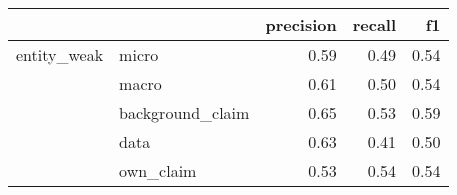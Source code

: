 \begin{tabular}{llrrr}
\toprule
            &           &  precision &  recall &   f1 \\
\midrule
entity\_weak & micro &       0.59 &    0.49 & 0.54 \\
            & macro &       0.61 &    0.50 & 0.54 \\
            & background\_claim &       0.65 &    0.53 & 0.59 \\
            & data &       0.63 &    0.41 & 0.50 \\
            & own\_claim &       0.53 &    0.54 & 0.54 \\
\bottomrule
\end{tabular}
